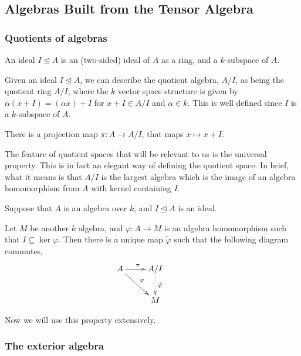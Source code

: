 \subsection{Algebras Built from the Tensor Algebra}
\subsubsection{Quotients of algebras}

An ideal $I \unlhd A$ is an (two-sided) ideal of $A$ as a ring, and a $k$-subspace of $A$. 

Given an ideal $I \unlhd A$, we can describe the quotient algebra, $A/I$,
as being the quotient ring $A/I$, where the $k$ vector space structure
is given by $\alpha(x+I) = (\alpha x) + I$ for $x + I \in A/I$
and $\alpha \in k$. This is well defined since $I$ is a $k$-subspace of $A$.

There is a projection map $\pi:A\rightarrow A/I$, that maps $x \mapsto x+I$.

The feature of quotient spaces that will be relevant to us is the universal property.
This is in fact an elegant way of defining the quotient space. In brief, what it
means is that $A/I$ is the largest algebra which is the image of an algebra homomorphism
from $A$ with kernel containing $I$.
\begin{proposition}
    Suppose that $A$ is an algebra over $k$, and $I \unlhd A$ is an ideal.

    Let $M$ be another $k$ algebra, and $\varphi:A\rightarrow M$
    is an algebra homomorphism such that $I \subseteq \ker\varphi$.
    Then there is a unique map $\tilde{\varphi}$ such that the following
    diagram commutes,
    \begin{displaymath}
    \xymatrix{
        A \ar[r]^\pi \ar[rd]^\varphi&
        A/I \ar@{.>}[d]^{\tilde{\varphi}}&\\
        &
        M
    }
    \end{displaymath}
\end{proposition}

Now we will use this property extensively. 

\subsubsection{The exterior algebra}

